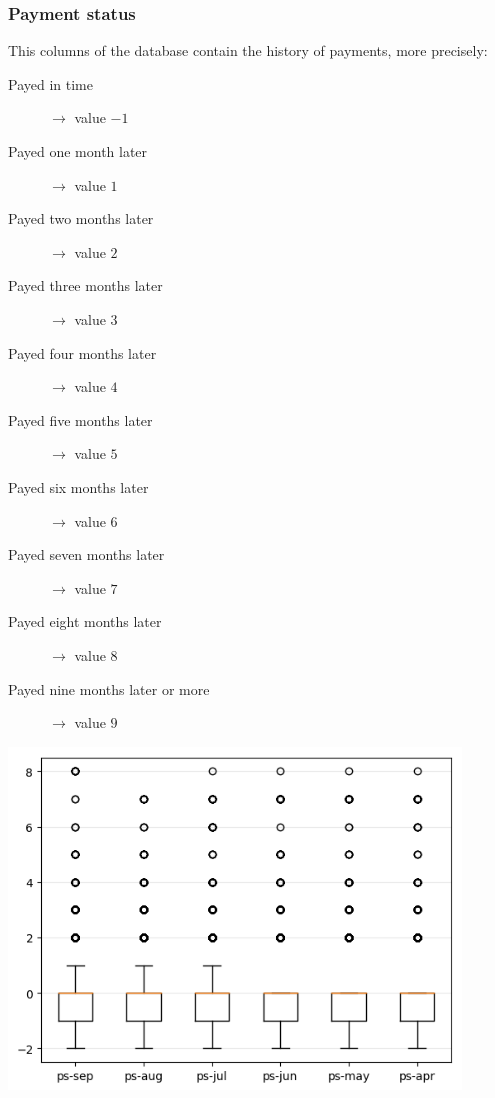 \documentclass[a4paper]{article}
\begin{document}
\subsubsection{Payment status}
This columns of the database contain the history of payments, more precisely:
\begin{description}
  \item[\sc Payed in time]$\rightarrow$ value $-1$

  \item[\sc Payed one month later]$\rightarrow$ value $1$

  \item[\sc Payed two months later]$\rightarrow$ value $2$

  \item[\sc Payed three months later]$\rightarrow$ value $3$

  \item[\sc Payed four months later]$\rightarrow$ value $4$

  \item[\sc Payed five months later]$\rightarrow$ value $5$

  \item[\sc Payed six months later]$\rightarrow$ value $6$

  \item[\sc Payed seven months later]$\rightarrow$ value $7$

  \item[\sc Payed eight months later]$\rightarrow$ value $8$

  \item[\sc Payed nine months later or more]$\rightarrow$ value $9$
\end{description}
\begin{center}
\includegraphics[width=0.9\textwidth]{../Code/boxPlotsGemma/boxplots/ps.png}
\end{center}


\end{document}
